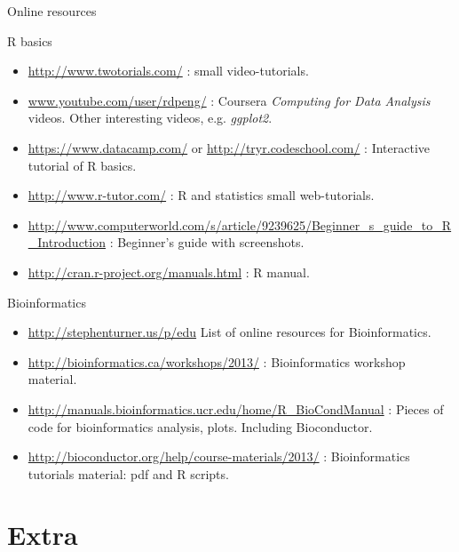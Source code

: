 \documentclass[10pt]{beamer}
\begin{document}
\begin{frame}[shrink=15]{Online resources}
  \begin{block}{R basics}
    \begin{itemize}
    \item \url{http://www.twotorials.com/} : small video-tutorials.
    \item \url{www.youtube.com/user/rdpeng/} : Coursera {\it Computing for Data Analysis} videos. Other interesting videos, e.g. {\it ggplot2}.
      \bigskip
    \item \url{https://www.datacamp.com/} or \url{http://tryr.codeschool.com/} : Interactive tutorial of R basics.
      \bigskip
    \item \url{http://www.r-tutor.com/} : R and statistics small web-tutorials.
    \item \url{http://www.computerworld.com/s/article/9239625/Beginner_s_guide_to_R_Introduction} : Beginner's guide with screenshots.      
    \item \url{http://cran.r-project.org/manuals.html} : R manual.
    \end{itemize}
  \end{block}
  
  \begin{block}{Bioinformatics}
    \begin{itemize}
    \item \url{http://stephenturner.us/p/edu} List of online resources for Bioinformatics.
    \item \url{http://bioinformatics.ca/workshops/2013/} : Bioinformatics workshop material.
    \item \url{http://manuals.bioinformatics.ucr.edu/home/R_BioCondManual} : Pieces of code for bioinformatics analysis, plots. Including Bioconductor.
    \item \url{http://bioconductor.org/help/course-materials/2013/} : Bioinformatics tutorials material: pdf and R scripts.
    \end{itemize}
  \end{block}


\end{frame}



\section{Extra}
\end{document}
